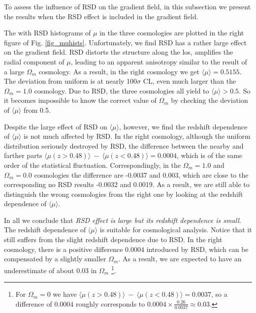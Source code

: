\documentclass{emulateapj}
\begin{document}
To assess the influence of RSD on the gradient field,
in this subsection we present the results when the RSD effect is included in the gradient field.

The with RSD histograms of $\mu$ in the three cosmologies are plotted in the right figure of Fig. \ref{fig_muhists}.
Unfortunately, we find RSD has a rather large effect on the gradient field.
RSD distorts the structure along the los, amplifies the radial component of $\mu$,
leading to an apparent anisotropy similar to the result of a large $\Omega_m$ cosmology.
As a result, in the right cosmology we get $\langle\mu\rangle=0.5155$.
The deviation from uniform is at nearly 100$\sigma$ CL, 
even much larger than the $\Omega_m=1.0$ cosmology.
Due to RSD, the three cosmologies all yield to $\langle\mu\rangle>0.5$.
So it becomes impossible to know the correct value of $\Omega_m$ by checking the deviation of $\langle\mu\rangle$ from 0.5.

Despite the large effect of RSD on $\langle\mu\rangle$, however, 
we find the redshift dependence of $\langle\mu\rangle$ is not much affected by RSD.
In the right cosmology, although the uniform distribution seriously destroyed by RSD,
the difference between the nearby and farther parts $\langle\mu(z>0.48)\rangle\ -\ \langle\mu(z<0.48)\rangle= 0.0004$,
which is of the same order of the statistical fluctuation.
Correspondingly, in the $\Omega_m=1.0$ and $\Omega_m=0.0$ cosmologies the difference are -0.0037 and 0.003,
which are close to the corresponding no RSD results -0.0032 and 0.0019.
As a result, we are still able to distinguish the wrong cosmologies from the right one
by looking at the redshift dependence of $\langle\mu\rangle$.

In all we conclude that {\it RSD effect is large but its redshift dependence is small}.
The redshift dependence of $\langle\mu\rangle$ is suitable for cosmological analysis.
Notice that it still suffers from the slight redshift dependence due to RSD.
In the right cosmology, there is a positive difference $0.0004$ introduced by RSD, 
which can be compensated by a slightly smaller $\Omega_m$.
As a result, we are expected to have an underestimate of about 0.03 in $\Omega_m$
\footnote{For $\Omega_m = 0$ we have $\langle\mu(z>0.48)\rangle\ -\ \langle\mu(z<0.48)\rangle= 0.0037$, 
so a difference of $0.0004$ roughly corresponds to $0.0004\times\frac{0.26}{0.0037}\approx0.03$.}.
\end{document}
